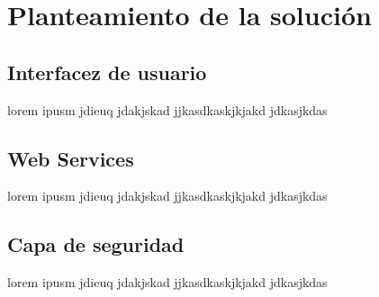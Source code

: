 \section{Planteamiento de la solución}
\subsection{Interfacez de usuario}
lorem ipusm jdieuq jdakjskad jjkasdkaskjkjakd jdkasjkdas
\subsection{Web Services}
lorem ipusm jdieuq jdakjskad jjkasdkaskjkjakd jdkasjkdas
\subsection{Capa de seguridad}
lorem ipusm jdieuq jdakjskad jjkasdkaskjkjakd jdkasjkdas
